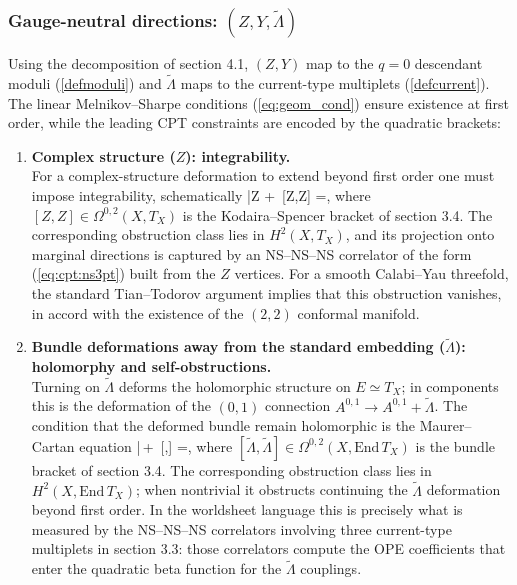 \documentclass[12pt]{article}
\begin{document}
\subsubsection*{Gauge-neutral directions: $(Z,Y,\widetilde\Lambda)$}

Using the decomposition of section 4.1, $(Z,Y)$ map to the $q=0$ descendant moduli (\ref{defmoduli}) and $\widetilde\Lambda$ maps to the current-type multiplets (\ref{defcurrent}). The linear Melnikov--Sharpe conditions (\ref{eq:geom_cond}) ensure existence at first order, while the leading CPT constraints are encoded by the quadratic brackets:
\begin{enumerate}
\item {\bf Complex structure ($Z$): integrability.}\\
For a complex-structure deformation to extend beyond first order one must impose integrability, schematically
\ie
\bar\partial Z \;+\; \,[Z,Z] \;=,
\fe
where $[Z,Z]\in\Omega^{0,2}(X,T_X)$ is the Kodaira--Spencer bracket of section 3.4. The corresponding obstruction class lies in $H^2(X,T_X)$, and its projection onto marginal directions is captured by an NS--NS--NS correlator of the form (\ref{eq:cpt:ns3pt}) built from the $Z$ vertices. For a smooth Calabi--Yau threefold, the standard Tian--Todorov argument implies that this obstruction vanishes, in accord with the existence of the $(2,2)$ conformal manifold.

\item {\bf Bundle deformations away from the standard embedding ($\widetilde\Lambda$): holomorphy and self-obstructions.}\\
Turning on $\widetilde\Lambda$ deforms the holomorphic structure on $E\simeq T_X$; in components this is the deformation of the $(0,1)$ connection $A^{0,1}\to A^{0,1}+\widetilde\Lambda$. The condition that the deformed bundle remain holomorphic is the Maurer--Cartan equation
\ie\label{eq:MC_bundle}
\bar\partial\,\widetilde\Lambda \;+\; \,[\widetilde\Lambda,\widetilde\Lambda] \;=,
\fe
where $[\widetilde\Lambda,\widetilde\Lambda]\in\Omega^{0,2}(X,\mathrm{End}\,T_X)$ is the bundle bracket of section 3.4. The corresponding obstruction class lies in $H^2(X,\mathrm{End}\,T_X)$; when nontrivial it obstructs continuing the $\widetilde\Lambda$ deformation beyond first order. In the worldsheet language this is precisely what is measured by the NS--NS--NS correlators involving three current-type multiplets in section 3.3: those correlators compute the OPE coefficients that enter the quadratic beta function for the $\widetilde\Lambda$ couplings.


\end{enumerate}
\end{document}
